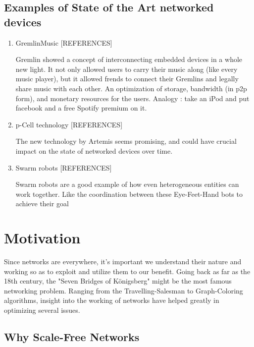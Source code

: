 \subsection{Examples of State of the Art networked devices }
\begin{enumerate}

\item GremlinMusic [REFERENCES]

Gremlin showed a concept of interconnecting embedded devices in a whole new light. It not only allowed users to carry their music along (like every music player), but it allowed frends to connect their Gremlins and legally share music with each other. An optimization of storage, bandwidth (in p2p form), and monetary resources for the users.  Analogy : take an iPod and put facebook and a free Spotify premium on it.

\item p-Cell technology [REFERENCES]

The new technology by Artemis seems promising, and could have crucial impact on the state of networked devices over time.


\item Swarm robots [REFERENCES]

Swarm robots are a good example of how even heterogeneous entities can work together. Like the coordination between these Eye-Feet-Hand bots to achieve their goal

\end{enumerate}




\section{Motivation}

Since networks are everywhere, it's important we understand their nature and working so as to exploit and utilize them to our benefit.  
Going back as far as the 18th century, the "Seven Bridges of Königsberg" might be the most famous networking problem. Ranging from the Travelling-Salesman to Graph-Coloring algorithms, insight into the working of networks have helped greatly in optimizing several issues.

\subsection{Why Scale-Free Networks}

